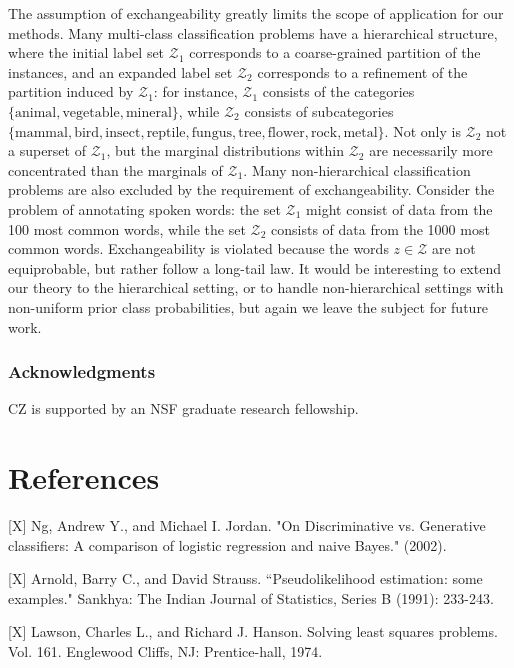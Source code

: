 \documentclass{article}
\begin{document}
The assumption of exchangeability greatly limits the scope of application for our methods.
 Many multi-class classification problems
have a hierarchical structure, where the initial label set $\mathcal{Z}_1$ corresponds to a coarse-grained partition of the instances, and an expanded label set $\mathcal{Z}_2$ corresponds to a refinement of the partition induced by $\mathcal{Z}_1$:
for instance, $\mathcal{Z}_1$ consists of the categories $\{\text{animal}, \text{vegetable}, \text{mineral}\}$,
while $\mathcal{Z}_2$ consists of subcategories 
$\{\text{mammal}, \text{bird}, \text{insect}, \text{reptile}, \text{fungus}, \text{tree}, \text{flower}, \text{rock}, \text{metal}\}$.
Not only is $\mathcal{Z}_2$ not a superset of $\mathcal{Z}_1$, but the marginal distributions within $\mathcal{Z}_2$ are necessarily more concentrated than the marginals of $\mathcal{Z}_1$.
Many non-hierarchical classification problems are also excluded by the requirement of exchangeability.
Consider the problem of annotating spoken words: the set $\mathcal{Z}_1$ might consist of data from the 100 most common words, while the set $\mathcal{Z}_2$ consists of data from the 1000 most common words.
Exchangeability is violated because the words $z \in \mathcal{Z}$ are not equiprobable, but rather follow a long-tail law.
It would be interesting to extend our theory to the hierarchical setting, or to handle non-hierarchical settings
with non-uniform prior class probabilities, but again we leave the subject for future work.

\subsubsection*{Acknowledgments}

CZ is supported by an NSF graduate research fellowship.

\section*{References}

\small

[X] Ng, Andrew Y., and Michael I. Jordan. "On Discriminative vs. Generative classifiers: A comparison of logistic regression and naive Bayes." (2002).

[X] Arnold, Barry C., and David Strauss. ``Pseudolikelihood estimation: some examples." Sankhya: The Indian Journal of Statistics, Series B (1991): 233-243.

[X] Lawson, Charles L., and Richard J. Hanson. Solving least squares problems. Vol. 161. Englewood Cliffs, NJ: Prentice-hall, 1974.
\end{document}
